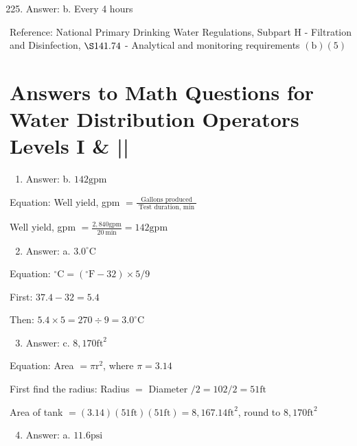 \documentclass[10pt]{article}
\begin{document}
\begin{enumerate}
  \setcounter{enumi}{224}
  \item Answer: b. Every 4 hours
\end{enumerate}

Reference: National Primary Drinking Water Regulations, Subpart $\mathrm{H}$ - Filtration and Disinfection, $\S 141.74$ - Analytical and monitoring requirements $(\mathrm{b})(5)$

\section{Answers to Math Questions for Water Distribution Operators Levels I \& ||}
\begin{enumerate}
  \item Answer: b. $142 \mathrm{gpm}$
\end{enumerate}

Equation: Well yield, gpm $=\frac{\text { Gallons produced }}{\text { Test duration, min }}$

Well yield, gpm $=\frac{2,840 \mathrm{gpm}}{20 \mathrm{~min}}=142 \mathrm{gpm}$

\begin{enumerate}
  \setcounter{enumi}{1}
  \item Answer: a. $3.0^{\circ} \mathrm{C}$
\end{enumerate}

Equation: ${ }^{\circ} \mathrm{C}=\left({ }^{\circ} \mathrm{F}-32\right) \times 5 / 9$

First: $37.4-32=5.4$

Then: $5.4 \times 5=270 \div 9=3.0^{\circ} \mathrm{C}$

\begin{enumerate}
  \setcounter{enumi}{2}
  \item Answer: c. $8,170 \mathrm{ft}^{2}$
\end{enumerate}

Equation: Area $=\pi \mathrm{r}^{2}$, where $\pi=3.14$

First find the radius: Radius $=$ Diameter $/ 2=102 / 2=51 \mathrm{ft}$

Area of tank $=(3.14)(51 \mathrm{ft})(51 \mathrm{ft})=8,167.14 \mathrm{ft}^{2}$, round to $8,170 \mathrm{ft}^{2}$

\begin{enumerate}
  \setcounter{enumi}{3}
  \item Answer: a. $11.6 \mathrm{psi}$
\end{enumerate}
\end{document}
